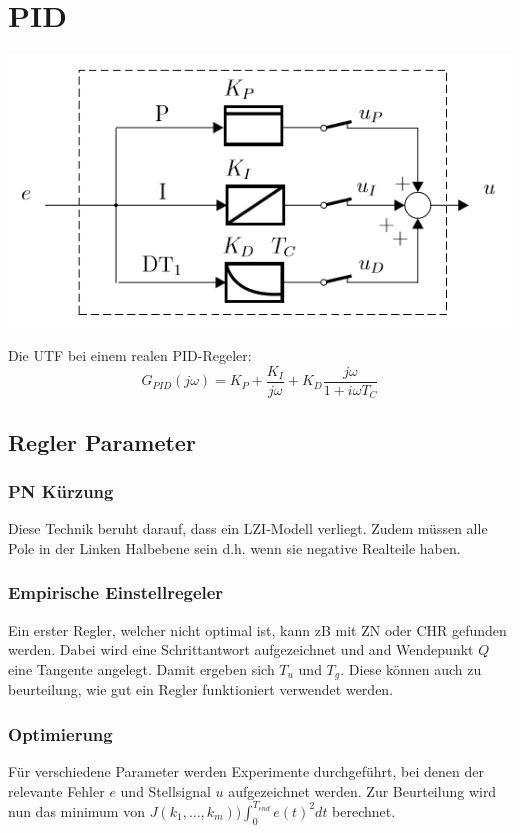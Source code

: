 \section{PID}
\begin{center}
 	\includegraphics[width=\columnwidth]{Images/pid}
\end{center}

Die UTF bei einem realen PID-Regeler:
\[
G_{PID}(j\omega) = K_P + \frac{K_I}{j\omega} + K_D\frac{j\omega}{1+i\omega T_C}
\]

\subsection{Regler Parameter}
\subsubsection{PN Kürzung}
Diese Technik beruht darauf, dass ein LZI-Modell verliegt. Zudem müssen alle Pole in der Linken Halbebene sein d.h. wenn sie negative Realteile haben.

\subsubsection{Empirische Einstellregeler}
Ein erster Regler, welcher nicht optimal ist, kann zB mit ZN oder CHR gefunden werden. Dabei wird eine Schrittantwort aufgezeichnet und and Wendepunkt $Q$ eine Tangente angelegt. Damit ergeben sich $T_u$ und $T_g$. Diese können auch zu beurteilung, wie gut ein Regler funktioniert verwendet werden. 

\subsubsection{Optimierung}
Für verschiedene Parameter werden Experimente durchgeführt, bei denen der relevante Fehler $e$ und Stellsignal $u$ aufgezeichnet werden. Zur Beurteilung wird nun das minimum von $J(k_1, \dots, k_m) ) \int_{0}^{T_{end}}e(t)^2dt$ berechnet.

